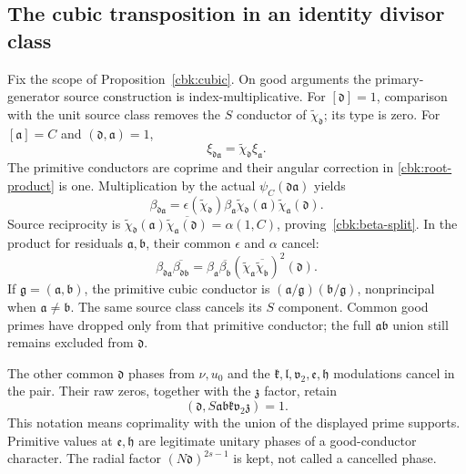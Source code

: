 \subsection{The cubic transposition in an identity divisor class}
\label{cbk:cubic-proof}
Fix the scope of Proposition~\ref{cbk:cubic}. On good arguments the
primary-generator source construction is index-multiplicative.
For $[\mathfrak d]=1$, comparison with the unit source class removes
the $S$ conductor of $\widetilde\chi_{\mathfrak d}$; its type is zero.
For $[\mathfrak a]=C$ and $(\mathfrak d,\mathfrak a)=1$,
\[
 \xi_{\mathfrak d\mathfrak a}
       =\widetilde\chi_{\mathfrak d}\xi_{\mathfrak a}.
\]
The primitive conductors are coprime and their angular correction in
\eqref{cbk:root-product} is one. Multiplication by the actual
$\psi_C(\mathfrak d\mathfrak a)$ yields
\[
 \beta_{\mathfrak d\mathfrak a}
 =\epsilon(\widetilde\chi_{\mathfrak d})\beta_{\mathfrak a}
        \widetilde\chi_{\mathfrak d}(\mathfrak a)
        \widetilde\chi_{\mathfrak a}(\mathfrak d).
\]
Source reciprocity is
$\widetilde\chi_{\mathfrak d}(\mathfrak a)
\overline{\widetilde\chi_{\mathfrak a}(\mathfrak d)}=\alpha(1,C)$,
proving~\eqref{cbk:beta-split}. In the product for residuals
$\mathfrak a,\mathfrak b$, their common $\epsilon$ and $\alpha$ cancel:
\begin{equation}\label{cbk:cubic-quotient}
 \beta_{\mathfrak d\mathfrak a}
       \overline{\beta_{\mathfrak d\mathfrak b}}
 =\beta_{\mathfrak a}\overline{\beta_{\mathfrak b}}
       (\widetilde\chi_{\mathfrak a}
                    \overline{\widetilde\chi_{\mathfrak b}})^2(\mathfrak d).
\end{equation}
If $\mathfrak g=(\mathfrak a,\mathfrak b)$, the primitive cubic
conductor is $(\mathfrak a/\mathfrak g)(\mathfrak b/\mathfrak g)$,
nonprincipal when $\mathfrak a\ne\mathfrak b$. The same source class
cancels its $S$ component. Common good primes have dropped only from
that primitive conductor; the full $\mathfrak a\mathfrak b$ union
still remains excluded from $\mathfrak d$.

The other common $\mathfrak d$ phases from $\nu,u_0$ and the
$\mathfrak k,\mathfrak l,\mathfrak v_2,\mathfrak e,\mathfrak h$
modulations cancel in the pair. Their raw zeros, together with the
$\mathfrak z$ factor, retain
\[
 (\mathfrak d,S\mathfrak a\mathfrak b\mathfrak k
                                      \mathfrak v_2\mathfrak z)=1.
\]
This notation means coprimality with the union of the displayed
prime supports. Primitive values at $\mathfrak e,\mathfrak h$ are
legitimate unitary phases of a good-conductor character.
The radial factor $(N\mathfrak d)^{2s-1}$ is kept, not called a
cancelled phase.


